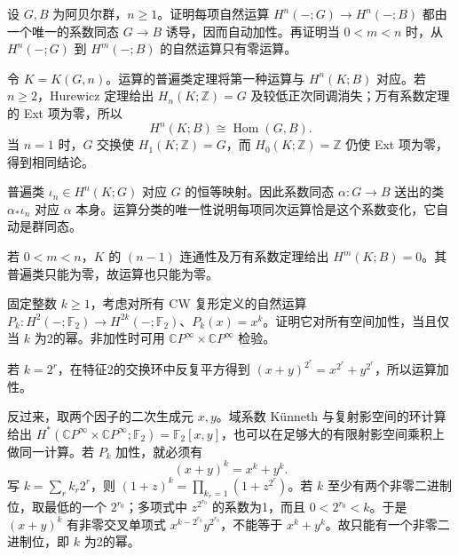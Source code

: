 \begin{exercise}\label{g2:ex:operations-nonincreasing-degree}
	设 \(G,B\) 为阿贝尔群，\(n\ge1\)。证明每项自然运算 \(H^n(-;G)\to H^n(-;B)\) 都由一个唯一的系数同态 \(G\to B\) 诱导，因而自动加性。再证明当 \(0<m<n\) 时，从 \(H^n(-;G)\) 到 \(H^m(-;B)\) 的自然运算只有零运算。
\end{exercise}
\begin{solution}
	令 \(K=K(G,n)\)。运算的普遍类定理将第一种运算与 \(H^n(K;B)\) 对应。若 \(n\ge2\)，Hurewicz 定理给出 \(H_n(K;\mathbb Z)=G\) 及较低正次同调消失；万有系数定理的 Ext 项为零，所以
	\[
		H^n(K;B)\cong\operatorname{Hom}(G,B).
	\]
	当 \(n=1\) 时，\(G\) 交换使 \(H_1(K;\mathbb Z)=G\)，而 \(H_0(K;\mathbb Z)=\mathbb Z\) 仍使 Ext 项为零，得到相同结论。

	普遍类 \(\iota_n\in H^n(K;G)\) 对应 \(G\) 的恒等映射。因此系数同态 \(\alpha:G\to B\) 送出的类 \(\alpha_*\iota_n\) 对应 \(\alpha\) 本身。运算分类的唯一性说明每项同次运算恰是这个系数变化，它自动是群同态。

	若 \(0<m<n\)，\(K\) 的 \((n-1)\) 连通性及万有系数定理给出 \(H^m(K;B)=0\)。其普遍类只能为零，故运算也只能为零。
\end{solution}

\begin{exercise}\label{g2:ex:additive-cup-powers}
	固定整数 \(k\ge1\)，考虑对所有 CW 复形定义的自然运算 \(P_k:H^2(-;\mathbb F_2)\to H^{2k}(-;\mathbb F_2)\)、\(P_k(x)=x^k\)。证明它对所有空间加性，当且仅当 \(k\) 为2的幂。非加性时可用 \(\mathbb CP^\infty\times\mathbb CP^\infty\) 检验。
\end{exercise}
\begin{solution}
	若 \(k=2^r\)，在特征2的交换环中反复平方得到 \((x+y)^{2^r}=x^{2^r}+y^{2^r}\)，所以运算加性。

	反过来，取两个因子的二次生成元 \(x,y\)。域系数 Künneth 与复射影空间的环计算给出 \(H^*(\mathbb CP^\infty\times\mathbb CP^\infty;\mathbb F_2)=\mathbb F_2[x,y]\)，也可以在足够大的有限射影空间乘积上做同一计算。若 \(P_k\) 加性，就必须有
	\[
		(x+y)^k=x^k+y^k.
	\]
	写 \(k=\sum_r k_r2^r\)，则 \((1+z)^k=\prod_{k_r=1}(1+z^{2^r})\)。若 \(k\) 至少有两个非零二进制位，取最低的一个 \(2^{r_0}\)；多项式中 \(z^{2^{r_0}}\) 的系数为1，而且 \(0<2^{r_0}<k\)。于是 \((x+y)^k\) 有非零交叉单项式 \(x^{k-2^{r_0}}y^{2^{r_0}}\)，不能等于 \(x^k+y^k\)。故只能有一个非零二进制位，即 \(k\) 为2的幂。
\end{solution}

